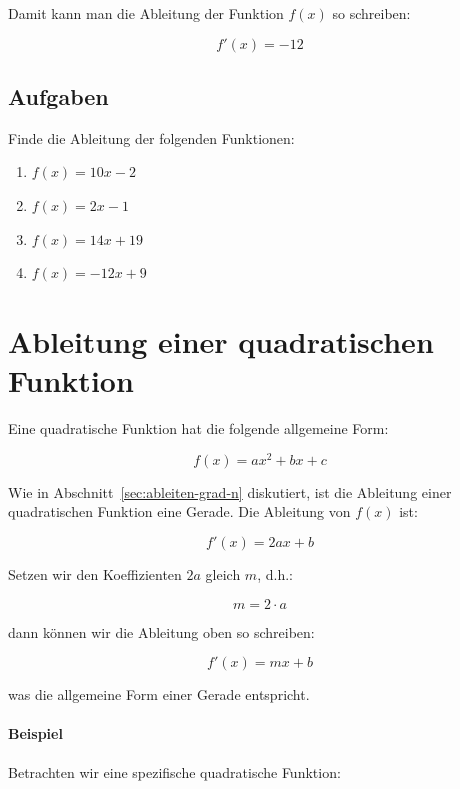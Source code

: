 \documentclass{scrartcl}
\begin{document}
Damit kann man die Ableitung der Funktion $f(x)$ so schreiben:

\begin{equation}
    f'(x) = -12
\end{equation}

\subsection{Aufgaben}
\label{ex:straight-lines}

Finde die Ableitung der folgenden Funktionen:

\begin{enumerate}
    \item $f(x) = 10 x - 2$
    \item $f(x) = 2 x - 1$
    \item $f(x) = 14 x + 19$
    \item $f(x) = -12 x + 9$
\end{enumerate}

\section{Ableitung einer quadratischen Funktion}

Eine quadratische Funktion hat die folgende allgemeine Form:

\begin{equation}
    f(x) = ax^2 + bx + c
\end{equation}

Wie in Abschnitt~\ref{sec:ableiten-grad-n} diskutiert, ist die Ableitung
einer quadratischen Funktion eine Gerade.  Die Ableitung von $f(x)$ ist:

\begin{equation}
    f'(x) = 2ax + b
\end{equation}

Setzen wir den Koeffizienten $2a$ gleich $m$, d.h.:

\begin{equation}
    m = 2 \cdot a
\end{equation}

dann können wir die Ableitung oben so schreiben:

\begin{equation}
    f'(x) = mx + b
\end{equation}

was die allgemeine Form einer Gerade entspricht.

\paragraph{Beispiel} Betrachten wir eine spezifische quadratische Funktion:
\end{document}
